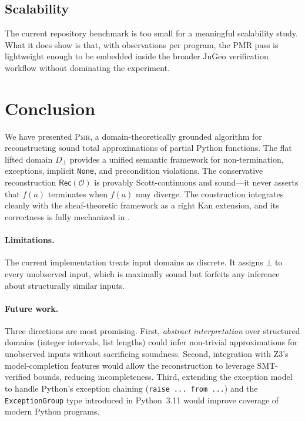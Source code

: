 \documentclass[11pt]{article}
\newcommand{\LiftD}[1]{#1_{\bot}}           %
\newcommand{\PMR}{\textsc{Pmr}}            %
\newcommand{\ObsSet}{\mathcal{O}}          %
\newcommand{\RecAlg}{\mathsf{Rec}}         %
\begin{document}
\subsection{Scalability}

The current repository benchmark is too small for a meaningful scalability
study.  What it does show is that, with
\ppXXXVMeanObsPerFunc{} observations per program, the PMR pass is lightweight
enough to be embedded inside the broader JuGeo verification workflow without
dominating the experiment.

\section{Conclusion}\label{sec:conclusion}

We have presented \PMR{}, a domain-theoretically grounded algorithm for
reconstructing sound total approximations of partial Python functions.
The flat lifted domain $\LiftD{D}$ provides a unified semantic
framework for non-termination, exceptions, implicit \texttt{None}, and
precondition violations.  The conservative reconstruction
$\RecAlg(\ObsSet)$ is provably Scott-continuous and sound---it never
asserts that $f(a)$ terminates when $f(a)$ may diverge.  The
construction integrates cleanly with the \JuGeo{} sheaf-theoretic
framework as a right Kan extension, and its correctness is fully
mechanized in \LEAN{}.

\paragraph{Limitations.}
The current implementation treats input domains as discrete.  It
assigns $\bot$ to every unobserved input, which is maximally sound but
forfeits any inference about structurally similar inputs.

\paragraph{Future work.}
Three directions are most promising.  First, \emph{abstract
interpretation} over structured domains (\eg integer intervals, list
lengths) could infer non-trivial approximations for unobserved inputs
without sacrificing soundness.  Second, integration with Z3's
model-completion features would allow the reconstruction to leverage
SMT-verified bounds, reducing incompleteness.  Third, extending the
exception model to handle Python's exception chaining
(\lstinline{raise ... from ...}) and the \texttt{ExceptionGroup} type
introduced in Python~3.11 would improve coverage of modern Python
programs.
\end{document}

